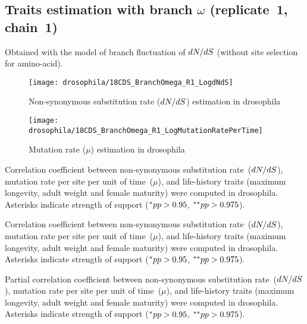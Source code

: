 \subsection{Traits estimation with branch \texorpdfstring{$\omega$}{ω} (replicate~1, chain~1)}
Obtained with the model of branch fluctuation of $\dnds$ (without site selection for amino-acid).

\begin{figure}[H]
    \centering
    \texttt{[image: drosophila/18CDS\_BranchOmega\_R1\_LogdNdS]}
    \caption[Non-synonymous {substitution} rate estimation in drosophila]{Non-synonymous {substitution} rate ($\dnds$) estimation in drosophila}
\end{figure}

\begin{figure}[H]
    \centering
    \texttt{[image: drosophila/18CDS\_BranchOmega\_R1\_LogMutationRatePerTime]}
    \caption[Mutation rate estimation in drosophila]{Mutation rate ($\mu$) estimation in drosophila}
\end{figure}


\begin{table}[H]
    
    \caption[Correlation coefficient matrix in drosophila ($\dnds$)]{
    Correlation coefficient between non-synonymous substitution rate~($\dnds$), mutation rate per site per unit of time~($\mu$), and life-history traits (maximum longevity, adult weight and female maturity) were computed in drosophila.
    Asterisks indicate strength of support ($\smash{^{*}} pp > 0.95$, $\smash{^{**}} pp > 0.975$).}
\end{table}

\begin{table}[H]
    
    \caption[Covariance matrix in drosophila ($\dnds$)]{
    Correlation coefficient between non-synonymous substitution rate~($\dnds$), mutation rate per site per unit of time~($\mu$), and life-history traits (maximum longevity, adult weight and female maturity) were computed in drosophila.
    Asterisks indicate strength of support ($\smash{^{*}} pp > 0.95$, $\smash{^{**}} pp > 0.975$).}
\end{table}

\begin{table}[H]
    
    \caption[Partial correlation coefficient matrix in drosophila ($\dnds$)]{
    Partial correlation coefficient between non-synonymous substitution rate~($\dnds$), mutation rate per site per unit of time~($\mu$), and life-history traits (maximum longevity, adult weight and female maturity) were computed in drosophila.
    Asterisks indicate strength of support ($\smash{^{*}} pp > 0.95$, $\smash{^{**}} pp > 0.975$).}
\end{table}


